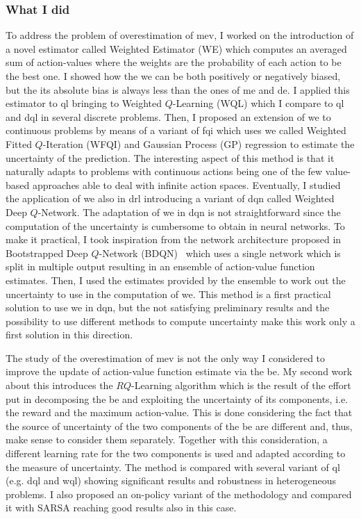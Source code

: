 \subsubsection{What I did}
To address the problem of overestimation of \gls{mev}, I worked on the introduction of a novel estimator called Weighted Estimator (WE) which computes an averaged sum of action-values where the weights are the probability of each action to be the best one. I showed how the \gls{we} can be both positively or negatively biased, but the its absolute bias is always less than the ones of \gls{me} and \gls{de}. I applied this estimator to \gls{ql} bringing to Weighted $Q$-Learning (WQL) which I compare to \gls{ql} and \gls{dql} in several discrete problems. Then, I proposed an extension of \gls{we} to continuous problems by means of a variant of \gls{fqi} which uses \gls{we} called Weighted Fitted $Q$-Iteration (WFQI) and Gaussian Process (GP) regression to estimate the uncertainty of the prediction. The interesting aspect of this method is that it naturally adapts to problems with continuous actions being one of the few value-based approaches able to deal with infinite action spaces. Eventually, I studied the application of \gls{we} also in \gls{drl} introducing a variant of \gls{dqn} called Weighted Deep $Q$-Network. The adaptation of \gls{we} in \gls{dqn} is not straightforward since the computation of the uncertainty is cumbersome to obtain in neural networks. To make it practical, I took inspiration from the network architecture proposed in Bootstrapped Deep $Q$-Network (BDQN)~\cite{osband2017deep} which uses a single network which is split in multiple output resulting in an ensemble of action-value function estimates. Then, I used the estimates provided by the ensemble to work out the uncertainty to use in the computation of \gls{we}. This method is a first practical solution to use \gls{we} in \gls{dqn}, but the not satisfying preliminary results and the possibility to use different methods to compute uncertainty make this work only a first solution in this direction.

The study of the overestimation of \gls{mev} is not the only way I considered to improve the update of action-value function estimate via the \gls{be}. My second work about this introduces the $RQ$-Learning algorithm which is the result of the effort put in decomposing the \gls{be} and exploiting the uncertainty of its components, i.e. the reward and the maximum action-value. This is done considering the fact that the source of uncertainty of the two components of the \gls{be} are different and, thus, make sense to consider them separately. Together with this consideration, a different learning rate for the two components is used and adapted according to the measure of uncertainty. The method is compared with several variant of \gls{ql} (e.g. \gls{dql} and \gls{wql}) showing significant results and robustness in heterogeneous problems. I also proposed an on-policy variant of the methodology and compared it with SARSA reaching good results also in this case.

